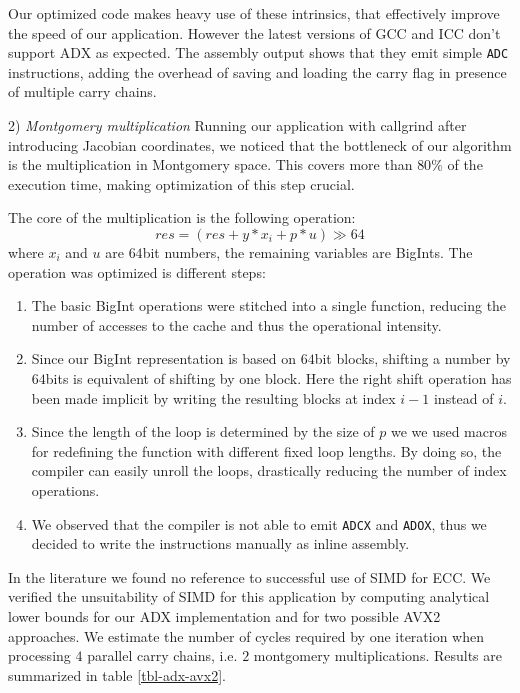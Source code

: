 Our optimized code makes heavy use of these intrinsics, that effectively improve the speed of our application. However the latest versions of GCC and ICC don't support ADX as expected. The assembly output shows that they emit simple \texttt{ADC} instructions, adding the overhead of saving and loading the carry flag in presence of multiple carry chains.

2) \emph{Montgomery multiplication}
Running our application with callgrind after introducing Jacobian coordinates, we noticed that the bottleneck of our algorithm is the multiplication in Montgomery space. This covers more than $80\%$ of the execution time, making optimization of this step crucial.
 
The core of the multiplication is the following operation:
$$res = \left(res + y * x_i + p * u\right) \gg 64$$
where $x_i$ and $u$ are $64$bit numbers, the remaining variables are BigInts. The operation was optimized is different steps:
\begin{enumerate}
\item The basic BigInt operations were stitched into a single function, reducing the number of accesses to the cache and thus the operational intensity.
\item Since our BigInt representation is based on $64$bit blocks, shifting a number by $64$bits is equivalent of shifting by one block. Here the right shift operation has been made implicit by writing the resulting blocks at index $i-1$ instead of $i$.
\item Since the length of the loop is determined by the size of $p$ we we used macros for redefining the function with different fixed loop lengths. By doing so, the compiler can easily unroll the loops, drastically reducing the number of index operations. 
\item We observed that the compiler is not able to emit \texttt{ADCX} and \texttt{ADOX}, thus we decided to write the instructions manually as inline assembly. 
\end{enumerate}

In the literature we found no reference to successful use of SIMD for ECC. We verified the unsuitability of SIMD for this application by computing analytical lower bounds for our ADX implementation and for two possible AVX2 approaches.
We estimate the number of cycles required by one iteration when processing $4$ parallel carry chains, i.e. $2$ montgomery multiplications. Results are summarized in table \ref{tbl-adx-avx2}.

